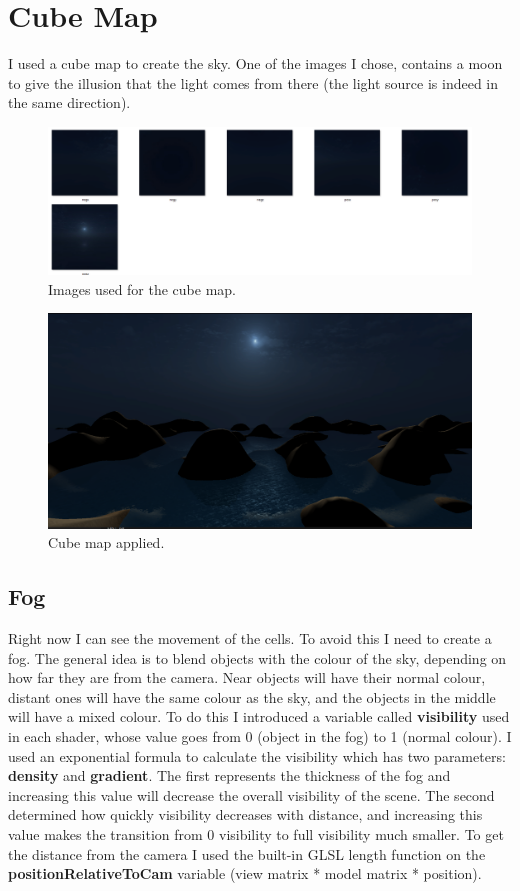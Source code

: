 \newpage

\section{Cube Map}
I used a cube map to create the sky. One of the images I chose, contains a moon to give the illusion that the light comes from there (the light source is indeed in the same direction).

\begin{figure}[hbt!]
	\centering
	\includegraphics[width= 1
	\textwidth]{images/Sky.png}
	\caption{Images used for the cube map.}
\end{figure}

\begin{figure}[hbt!]
\centering
\includegraphics[width= 1
\textwidth]{images/Sky2.png}
\caption{Cube map applied.}
\end{figure}

\subsection{Fog}
Right now I can see the movement of the cells. To avoid this I need to create a fog. The general idea is to blend objects with the colour of the sky, depending on how far they are from the camera. Near objects will have their normal colour, distant ones will have the same colour as the sky, and the objects in the middle will have a mixed colour. To do this I introduced a variable called \textbf{visibility} used in each shader, whose value goes from 0 (object in the fog) to 1 (normal colour). I used an exponential formula to calculate the visibility which has two parameters: \textbf{density} and \textbf{gradient}. The first represents the thickness of the fog and increasing this value will decrease the overall visibility of the scene. The second determined how quickly visibility decreases with distance, and increasing this value makes the transition from 0 visibility to full visibility much smaller. To get the distance from the camera I used the built-in GLSL length function on the \textbf{positionRelativeToCam} variable (view matrix * model matrix * position).

